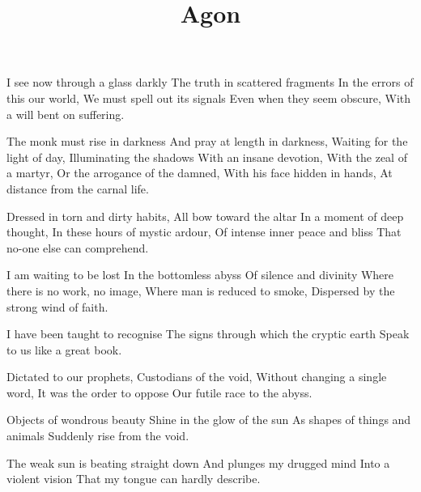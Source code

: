 \documentclass{article}
\title{Agon}
\newenvironment{stanza}{\begin{minipage}{10cm}\obeylines}{\end{minipage}\vspace{\baselineskip}}
\begin{document}
\maketitle

\clearpage


\begin{stanza}
I see now through a glass darkly
The truth in scattered fragments
In the errors of this our world,
We must spell out its signals
Even when they seem obscure,
With a will bent on suffering.
\end{stanza}

\begin{stanza}
The monk must rise in darkness
And pray at length in darkness,
Waiting for the light of day,
Illuminating the shadows
With an insane devotion,
With the zeal of a martyr,
Or the arrogance of the damned,
With his face hidden in hands,
At distance from the carnal life.
\end{stanza}

\begin{stanza}
Dressed in torn and dirty habits,
All bow toward the altar
In a moment of deep thought,
In these hours of mystic ardour,
Of intense inner peace and bliss
That no-one else can comprehend.
\end{stanza}

\begin{stanza}
I am waiting to be lost
In the bottomless abyss
Of silence and divinity
Where there is no work, no image,
Where man is reduced to smoke,
Dispersed by the strong wind of faith.
\end{stanza}

\begin{stanza}
I have been taught to recognise
The signs through which the cryptic earth
Speak to us like a great book.
\end{stanza}

\begin{stanza}
Dictated to our prophets,
Custodians of the void,
Without changing a single word,
It was the order to oppose
Our futile race to the abyss.
\end{stanza}

\begin{stanza}
Objects of wondrous beauty
Shine in the glow of the sun
As shapes of things and animals
Suddenly rise from the void.
\end{stanza}

\begin{stanza}
The weak sun is beating straight down
And plunges my drugged mind
Into a violent vision
That my tongue can hardly describe.
\end{stanza}
\end{document}
